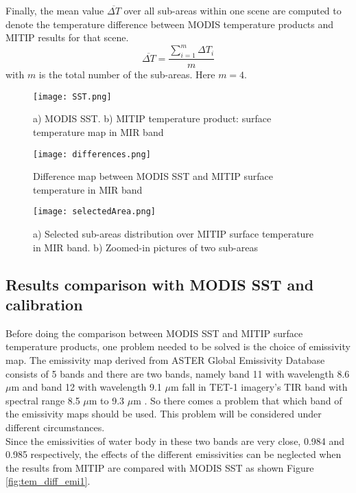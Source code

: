 \noindent Finally, the mean value $\overline{\Delta T}$ over all sub-areas within one scene are computed to denote the temperature difference between MODIS temperature products and MITIP results for that scene.\\
\begin{equation}
\label{eq1}
\overline{\Delta T} =\frac{\sum_{i=1}^m \Delta T_i}{m}
\end{equation}
with $m$ is the total number of the sub-areas. Here $m = 4$.

\begin{figure}[!htbp]
\centering\texttt{[image: SST.png]}
\caption{a) MODIS SST. b) MITIP temperature product: surface temperature map in MIR band}
\label{fig:SST}
\end {figure}

\begin{figure}[!htbp]
\centering\texttt{[image: differences.png]}
\caption{Difference map between MODIS SST and MITIP surface temperature in MIR band}
\label{fig:Diff}
\end{figure}

\begin{figure}[!htbp]
\centering\texttt{[image: selectedArea.png]}
\caption{a) Selected sub-areas distribution over MITIP surface temperature in MIR band. b) Zoomed-in pictures of two sub-areas}
\label{fig:selectedArea}
\end{figure}


\subsection{Results comparison with MODIS SST and calibration}
Before doing the comparison between MODIS SST and MITIP surface temperature products, one problem needed to be solved is the choice of emissivity map. The emissivity map derived from ASTER Global Emissivity Database consists of 5 bands and there are two bands, namely band 11 with wavelength 8.6 $\mu$m and band 12 with wavelength 9.1 $\mu$m fall in TET-1 imagery's TIR band with spectral range 8.5 $\mu$m to 9.3 $\mu$m \parencite{Reference306}. So there comes a problem that which band of the emissivity maps should be used. This problem will be considered under different circumstances.\\

\noindent Since the emissivities of water body in these two bands are very close, 0.984  and 0.985 respectively, the effects of the different emissivities can be neglected when the results from MITIP are compared with MODIS SST as shown Figure \ref{fig:tem_diff_emi1}.\\

